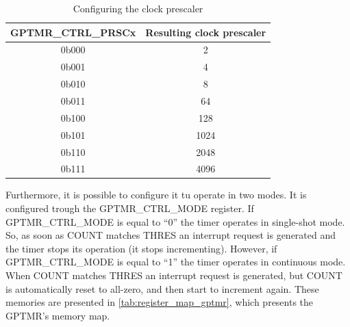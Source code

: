         \begin{table}[!ht]
        	\centering
        	\caption{Configuring the clock prescaler}
        	\begin{tabular}{cc}
        		\toprule
        		\textbf{GPTMR\_CTRL\_PRSCx} & \textbf{Resulting clock prescaler} \\
        		\midrule
        		0b000 & 2 \\
        		0b001 & 4 \\
        		0b010 & 8 \\
        		0b011 & 64 \\
        		0b100 & 128 \\
        		0b101 & 1024 \\
        		0b110 & 2048 \\
        		0b111 & 4096 \\
        		\bottomrule
        	\end{tabular}
        	\label{tab:clock_prescaler}
        \end{table}

        Furthermore, it is possible to configure it tu operate in two modes. It is configured trough the GPTMR\_CTRL\_MODE register. If GPTMR\_CTRL\_MODE is equal to ``0'' the timer operates in single-shot mode. So, as soon as COUNT matches THRES an interrupt request is generated and the timer stops its operation (it stops incrementing). However, if GPTMR\_CTRL\_MODE is equal to ``1'' the timer operates in continuous mode. When COUNT matches THRES an interrupt request is generated, but COUNT is automatically reset to all-zero, and then start to increment again. These memories are presented in \autoref{tab:register_map_gptmr}, which presents the GPTMR's memory map.

        \begin{table}[!ht]
        	\centering
        	\caption{GPTMR's memory-mapped registers.}
        	\label{tab:register_map_gptmr}
        \end{table}
                
